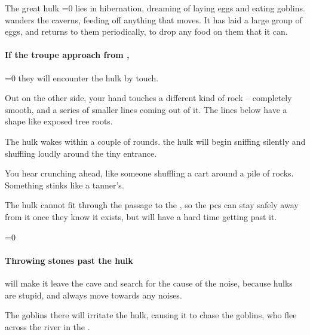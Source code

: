 \begin{multicols}{2}


\begin{exampletext}
  The great \gls{hulk}%
  \ifnum\value{temperature}=0
    lies in hibernation, dreaming of laying eggs and eating goblins.
  \else
    wanders the caverns, feeding off anything that moves.
    It has laid a large group of eggs, and returns to them periodically, to drop any food on them that it can.
  \fi
\end{exampletext}

\paragraph{If the troupe approach from ,}
\ifnum\value{temperature}=0
  they will encounter the \gls{hulk} by touch.

  \begin{boxtext}
    Out on the other side, your hand touches a different kind of rock -- completely smooth, and a series of smaller lines coming out of it.
    The lines below have a shape like exposed tree roots.
  \end{boxtext}

  The \gls{hulk} wakes within a couple of \glspl{round}.
\else
  the \gls{hulk} will begin sniffing silently and shuffling loudly around the tiny entrance.

  \begin{boxtext}
    You hear crunching ahead, like someone shuffling a cart around a pile of rocks.
    Something stinks like a tanner's.
  \end{boxtext}
\fi

The \gls{hulk} cannot fit through the passage to the , so the \glspl{pc} can stay safely away from it once they know it exists, but will have a hard time getting past it.

\ifnum\value{temperature}=0\else
  \paragraph{Throwing stones past the \gls{hulk}}
  will make it leave the cave and search for the cause of the noise, because \glspl{hulk} are stupid, and always move towards any noises.
\fi

\umberhulk

The goblins there will irritate the \gls{hulk}, causing it to chase the goblins, who flee across the river in the .


\end{multicols}
